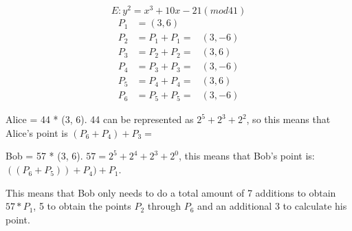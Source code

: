 
\[ E: y^2 = x^3 + 10x - 21 ({mod} 41) \]
\setcounter{equation}{-1}
\begin{eqnarray}
P_1 &= (3, 6)& \\
P_2 &= P_1 + P_1 = & (3, -6) \\
P_3 &= P_2 + P_2 = & (3, 6) \\
P_4 &= P_3 + P_3 = & (3, -6) \\
P_5 &= P_4 + P_4 = & (3, 6) \\
P_6 &= P_5 + P_5 = & (3, -6)
\end{eqnarray}

Alice = 44 * (3, 6). 44 can be represented as $2^5 + 2^3 + 2^2$, so this means that Alice's point is $(P_6 + P_4) + P_3 = $

Bob = 57 * (3, 6). $57 = 2^5 + 2^4 + 2^3 + 2^0$, this means that Bob's point is: $((P_6 + P_5)) + P_4) + P_1$.

This means that Bob only needs to do a total amount of 7 additions to obtain $57 * P_1$, 5 to obtain the points $P_2$ through $P_6$ and an additional 3 to calculate his point.